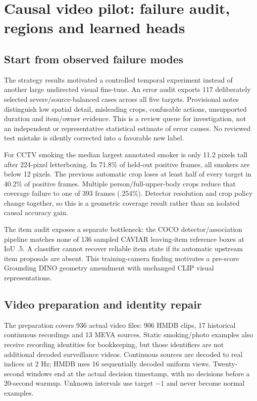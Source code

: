 \chapter{Causal video pilot: failure audit, regions and learned heads}
\label{ch:pilot}
\section{Start from observed failure modes}
The strategy results motivated a controlled temporal experiment instead of another large undirected visual fine-tune. An error audit exports 117 deliberately selected severe/source-balanced cases across all five targets. Provisional notes distinguish low spatial detail, misleading crops, confusable actions, unsupported duration and item/owner evidence. This is a review queue for investigation, not an independent or representative statistical estimate of error causes. No reviewed test mistake is silently corrected into a favorable new label.

For CCTV smoking the median largest annotated smoker is only 11.2 pixels tall after 224-pixel letterboxing. In 71.8\% of held-out positive frames, all smokers are below 12 pixels. The previous automatic crop loses at least half of every target in 40.2\% of positive frames. Multiple person/full-upper-body crops reduce that coverage failure to one of 393 frames (.254\%). Detector resolution and crop policy change together, so this is a geometric coverage result rather than an isolated causal accuracy gain.


The item audit exposes a separate bottleneck: the COCO detector/association pipeline matches none of 136 sampled CAVIAR leaving-item reference boxes at IoU .5. A classifier cannot recover reliable item state if its automatic upstream item proposals are absent. This training-camera finding motivates a pre-score Grounding DINO geometry amendment with unchanged CLIP visual representations.

\section{Video preparation and identity repair}
The preparation covers 936 actual video files: 906 HMDB clips, 17 historical continuous recordings and 13 MEVA sources. Static smoking/photo examples also receive recording identities for bookkeeping, but those identifiers are not additional decoded surveillance videos. Continuous sources are decoded to real indices at 2 Hz; HMDB uses 16 sequentially decoded uniform views. Twenty-second windows end at the actual decision timestamp, with no decisions before a 20-second warmup. Unknown intervals use target $-1$ and never become normal examples.

